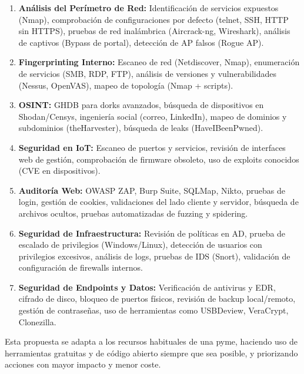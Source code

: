 \documentclass[a4paper, 10pt]{article}
\begin{document}
\begin{enumerate}
\item \textbf{Análisis del Perímetro de Red:} Identificación de servicios expuestos (Nmap), comprobación de configuraciones por defecto (telnet, SSH, HTTP sin HTTPS), pruebas de red inalámbrica (Aircrack-ng, Wireshark), análisis de captivos (Bypass de portal), detección de AP falsos (Rogue AP).

\item \textbf{Fingerprinting Interno:} Escaneo de red (Netdiscover, Nmap), enumeración de servicios (SMB, RDP, FTP), análisis de versiones y vulnerabilidades (Nessus, OpenVAS), mapeo de topología (Nmap + scripts).

\item \textbf{OSINT:} GHDB para dorks avanzados, búsqueda de dispositivos en Shodan/Censys, ingeniería social (correo, LinkedIn), mapeo de dominios y subdominios (theHarvester), búsqueda de leaks (HaveIBeenPwned).

\item \textbf{Seguridad en IoT:} Escaneo de puertos y servicios, revisión de interfaces web de gestión, comprobación de firmware obsoleto, uso de exploits conocidos (CVE en dispositivos).

\item \textbf{Auditoría Web:} OWASP ZAP, Burp Suite, SQLMap, Nikto, pruebas de login, gestión de cookies, validaciones del lado cliente y servidor, búsqueda de archivos ocultos, pruebas automatizadas de fuzzing y spidering.

\item \textbf{Seguridad de Infraestructura:} Revisión de políticas en AD, prueba de escalado de privilegios (Windows/Linux), detección de usuarios con privilegios excesivos, análisis de logs, pruebas de IDS (Snort), validación de configuración de firewalls internos.

\item \textbf{Seguridad de Endpoints y Datos:} Verificación de antivirus y EDR, cifrado de disco, bloqueo de puertos físicos, revisión de backup local/remoto, gestión de contraseñas, uso de herramientas como USBDeview, VeraCrypt, Clonezilla.

\end{enumerate}

Esta propuesta se adapta a los recursos habituales de una pyme, haciendo uso de herramientas gratuitas y de código abierto siempre que sea posible, y priorizando acciones con mayor impacto y menor coste.
\end{document}
